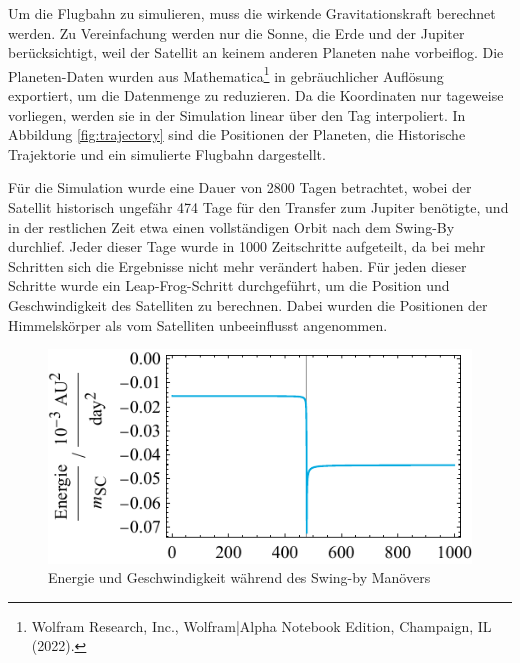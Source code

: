 Um die Flugbahn zu simulieren, muss die wirkende Gravitationskraft berechnet werden.
Zu Vereinfachung werden nur die Sonne, die Erde und der Jupiter berücksichtigt, weil der Satellit an keinem anderen Planeten nahe vorbeiflog.
Die Planeten-Daten wurden aus Mathematica\footnote{Wolfram Research, Inc., Wolfram|Alpha Notebook Edition, Champaign, IL (2022).} in gebräuchlicher Auflösung exportiert, um die Datenmenge zu reduzieren.
Da die Koordinaten nur tageweise vorliegen, werden sie in der Simulation linear über den Tag interpoliert.
In Abbildung \ref{fig:trajectory} sind die Positionen der Planeten, die Historische Trajektorie und ein simulierte Flugbahn dargestellt.

Für die Simulation wurde eine Dauer von 2800 Tagen betrachtet, wobei der Satellit historisch ungefähr 474 Tage für den Transfer zum Jupiter benötigte, und in der restlichen Zeit etwa einen vollständigen Orbit nach dem Swing-By durchlief.
Jeder dieser Tage wurde in 1000 Zeitschritte aufgeteilt, da bei mehr Schritten sich die Ergebnisse nicht mehr verändert haben.
Für jeden dieser Schritte wurde ein Leap-Frog-Schritt durchgeführt, um die Position und Geschwindigkeit des Satelliten zu berechnen. Dabei wurden die Positionen der Himmelskörper als vom Satelliten unbeeinflusst angenommen.


\begin{figure}[h!]
	\centering
	\includegraphics{img/energy.pdf}
	\caption{Energie und Geschwindigkeit während des Swing-by Manövers}
	\label{fig:energie}
\end{figure}



